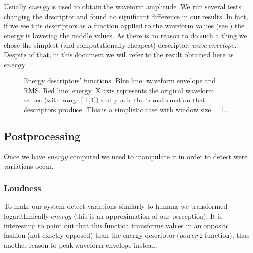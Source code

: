 \documentclass{article}
\begin{document}
Usually ${energy}$ is used to obtain the waveform amplitude.
We run several tests changing the descriptor and found no significant difference in our results.
In fact, if we see this descriptors as a function applied to the waveform values (see )
the energy is lowering the middle values.
As there is no reason to do such a thing we chose the simplest (and computationally cheapest) descriptor: ${wave\ envelope}$.
Despite of that, in this document we will refer to the result obtained here as ${energy}$.

\begin{figure}
 \centerline{}
 \caption{Energy descriptors' functions. Blue line: waveform envelope and RMS. Red line: energy. X axis represents the original waveform values
 (with range [-1,1]) and y axis the transformation that descriptors produce. This is a simplistic case with window size = 1.}
 \label{fig:energy_descriptors}
\end{figure} 

\subsection{Postprocessing}
Once we have ${energy}$ computed we need to manipulate it in order to detect were variations occur.

\subsubsection{Loudness}
To make our system detect variations similarly to humans we transformed logarithmically ${energy}$ (this is an approximation of our perception).
It is interesting to point out that this function transforms values in an opposite fashion (not exactly opposed) than the energy descriptor
(${power\ 2}$ function), thus another reason to peak waveform envelope instead.
\end{document}
